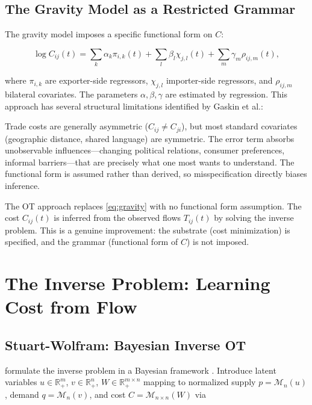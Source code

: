 \documentclass[12pt]{article}
\newcommand{\Cij}{C_{ij}}
\begin{document}
\subsection{The Gravity Model as a Restricted Grammar}

The gravity model imposes a specific functional form on $C$:

\begin{equation}
\log \Cij(t) = \sum_k \alpha_k \pi_{i,k}(t) + \sum_l \beta_l \chi_{j,l}(t) + \sum_m \gamma_m \rho_{ij,m}(t),
\label{eq:gravity}
\end{equation}

where $\pi_{i,k}$ are exporter-side regressors, $\chi_{j,l}$ importer-side regressors, and $\rho_{ij,m}$ bilateral covariates. The parameters $\alpha, \beta, \gamma$ are estimated by regression. This approach has several structural limitations identified by Gaskin et al.:

Trade costs are generally asymmetric ($C_{ij} \neq C_{ji}$), but most standard covariates (geographic distance, shared language) are symmetric. The error term absorbs unobservable influences---changing political relations, consumer preferences, informal barriers---that are precisely what one most wants to understand. The functional form is assumed rather than derived, so misspecification directly biases inference.

The OT approach replaces \eqref{eq:gravity} with no functional form assumption. The cost $C_{ij}(t)$ is inferred from the observed flows $T_{ij}(t)$ by solving the inverse problem. This is a genuine improvement: the substrate (cost minimization) is specified, and the grammar (functional form of $C$) is not imposed.

\section{The Inverse Problem: Learning Cost from Flow}

\subsection{Stuart-Wolfram: Bayesian Inverse OT}

\citet{stuart2019} formulate the inverse problem in a Bayesian framework \citep[building on the general theory of statistical inverse problems in][]{kaipio2006}. Introduce latent variables $u \in \mathbb{R}^m_+$, $v \in \mathbb{R}^n_+$, $W \in \mathbb{R}^{m \times n}_+$ mapping to normalized supply $p = \mathcal{M}_n(u)$, demand $q = \mathcal{M}_n(v)$, and cost $C = \mathcal{M}_{n \times n}(W)$ via
\end{document}
